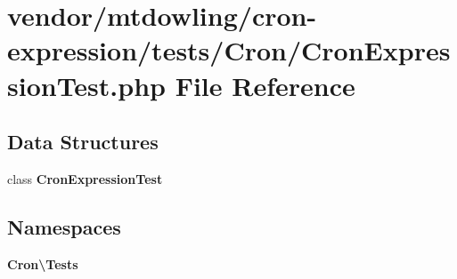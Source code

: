 \section{vendor/mtdowling/cron-\/expression/tests/\+Cron/\+Cron\+Expression\+Test.php File Reference}
\label{_cron_expression_test_8php}
\subsection*{Data Structures}
\begin{DoxyCompactItemize}
\item 
class {\bf Cron\+Expression\+Test}
\end{DoxyCompactItemize}
\subsection*{Namespaces}
\begin{DoxyCompactItemize}
\item 
 {\bf Cron\textbackslash{}\+Tests}
\end{DoxyCompactItemize}
